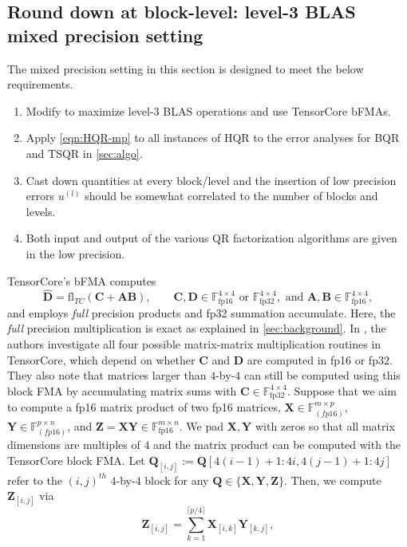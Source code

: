 \documentclass[review,onefignum,onetabnum]{siamart190516}
\newcommand{\F}{\mathbb{F}}
\newcommand{\bb}[1]{\mathbf{#1}}
\newcommand{\fl}{\mathrm{fl}}
\begin{document}
\subsection{Round down at block-level: level-3 BLAS mixed precision setting}\label{sec:mp-3}
The mixed precision setting in this section is designed to meet the below requirements.
\begin{enumerate}
	\item Modify  to maximize level-3 BLAS operations and use TensorCore bFMAs. 
	\item Apply \cref{eqn:HQR-mp} to all instances of HQR to the error analyses for BQR and TSQR in \cref{sec:algo}.
	\item Cast down quantities at every block/level and the insertion of low precision errors $u^{(l)}$ should be somewhat correlated to the number of blocks and levels. 
	\item Both input and output of the various QR factorization algorithms are given in the low precision. 
\end{enumerate}
TensorCore's bFMA computes 
\begin{equation}
\hat{\bb{D}} =\fl_{TC}(\bb{C} + \bb{A}\bb{B}),\qquad \bb{C},\bb{D}\in\F_{\text{fp16}}^{4\times 4}\text{ or }\F_{\text{fp32}}^{4\times 4},\text{ and } \bb{A},\bb{B}\in\F_{\text{fp16}}^{4\times 4},\label{eqn:bFMA}
\end{equation}
and employs \emph{full} precision products and fp32 summation accumulate.
Here, the \emph{full} precision multiplication is exact as explained in \cref{sec:background}.
In \cite{Blanchard2020}, the authors investigate all four possible matrix-matrix multiplication routines in TensorCore, which depend on whether $\bb{C}$ and $\bb{D}$ are computed in fp16 or fp32. 
They also note that matrices larger than $4$-by-$4$ can still be computed using this block FMA by accumulating matrix sums with $\bb{C}\in\F_{\text{fp32}}^{4\times 4}$.
Suppose that we aim to compute a fp16 matrix product of two fp16 matrices, $\bb{X}\in\F_{(fp16)}^{m\times p}$, $\bb{Y}\in\F_{(fp16)}^{p\times n}$, and $\bb{Z}=\bb{XY}\in\F_{\text{fp16}}^{m\times n}$.
We pad $\bb{X},\bb{Y}$ with zeros so that all matrix dimensions are multiples of $4$ and the matrix product can be computed with the TensorCore block FMA.
Let $\bb{Q}_{[i,j]}:= \bb{Q}[4(i-1)+1:4i,4(j-1)+1:4j]$ refer to the $(i,j)^{th}$ $4$-by-$4$ block for any $\bb{Q}\in\{\bb{X},\bb{Y},\bb{Z}\}$.
Then, we compute $\bb{Z}_{[i,j]}$ via \[
\bb{Z}_{[i,j]} = \sum_{k=1}^{\lceil p/4\rceil} \bb{X}_{[i,k]} \bb{Y}_{[k,j]},
\]
\end{document}
